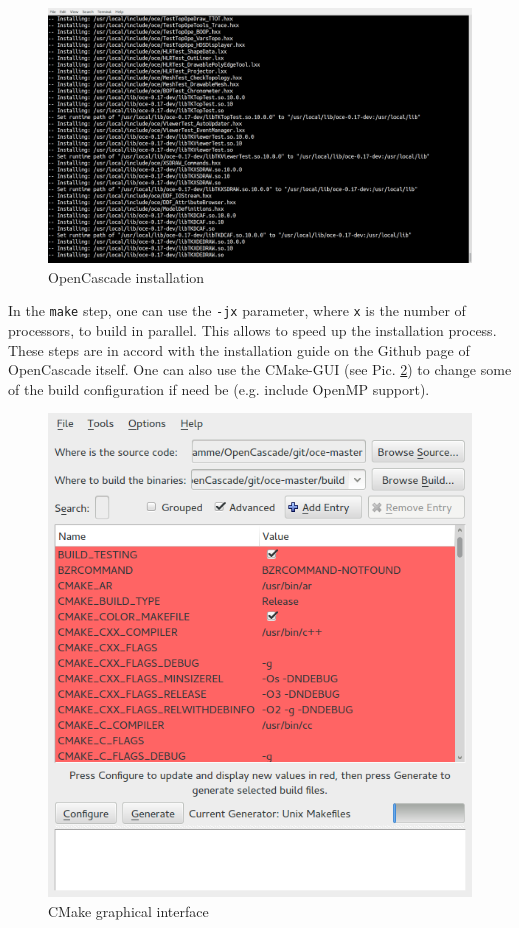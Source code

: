 \documentclass[11pt,a4paper,article,bibtotoc,idxtotoc,headsepline,footsepline,footexclude,DIV13,oneside]{scrbook}
\begin{document}
\begin{figure}
\centering
\includegraphics[scale=0.3]{img/OC_Install2.png}
\caption{OpenCascade installation}
\label{fig:OC_install}
\end{figure}
	In the \texttt{make} step, one can use the \texttt{-jx} parameter, where \texttt{x} is the number of processors, to build in parallel. This allows to speed up the installation process. These steps are in accord with the installation guide on the Github page of OpenCascade itself. One can also use the CMake-GUI (see Pic. \ref{fig:CMake_GUI}) to change some of the build configuration if need be (e.g. include OpenMP support).
	
\begin{figure}
\centering
\includegraphics[scale=0.5]{img/CMake_GUI.png}
\caption{CMake graphical interface}
\label{fig:CMake_GUI}
\end{figure}
\end{document}
